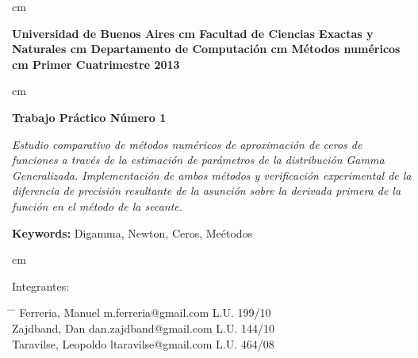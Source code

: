  cm
\begin{flushright}
\huge\bf Universidad de Buenos Aires
 cm
\Large\bf Facultad de Ciencias Exactas y Naturales
 cm
\Large\bf Departamento de Computaci\'on
 cm
\Large\bf  M\'etodos num\'ericos
 cm
\Large\bf Primer Cuatrimestre 2013
\end{flushright}

 cm
\begin{center}
\LARGE\bf Trabajo Pr\'actico N\'umero 1

\vskip 1.0cm
\normalsize \emph{Estudio comparativo de m\'etodos num\'ericos de aproximaci\'on de ceros de funciones a trav\'es de la estimaci\'on de par\'ametros de la distribuci\'on Gamma Generalizada. Implementaci\'on de ambos m\'etodos y verificaci\'on experimental de la diferencia de precisi\'on resultante de la asunci\'on sobre la derivada primera de la funci\'on en el m\'etodo de la secante.}

\vskip 1.0cm
\large {\bf Keywords:} Digamma, Newton, Ceros, Me\'etodos

\end{center}



 cm
\begin{flushleft}
\large Integrantes:
\begin{tabbing}
\hspace{5cm} \= \hspace{5.5cm} \= \hspace{3cm} \kill
Ferreria, Manuel \> m.ferreria@gmail.com \> L.U. 199/10  \\
Zajdband, Dan \> dan.zajdband@gmail.com \> L.U. 144/10 \\
Taravilse, Leopoldo \> ltaravilse@gmail.com \> L.U. 464/08\\
\end{tabbing}
\end{flushleft}
